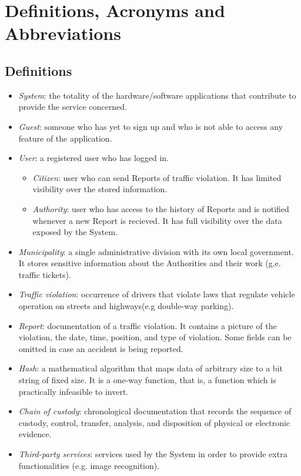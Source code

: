 \documentclass{report}
\begin{document}
\section{Definitions, Acronyms and Abbreviations}
\subsection{Definitions}
\begin{itemize}
	\item \textit{System}: the totality of the hardware/software applications that contribute to provide the service concerned.
    \item \textit{Guest}: someone who has yet to sign up and who is not able to access any feature of the application.
    \item \textit{User}: a registered user who has logged in.
	\begin{itemize}
		\item \textit{Citizen}: user who can send Reports of traffic violation. It has limited visibility over the stored information.
		\item \textit{Authority}: user who has access to the history of Reports and is notified whenever a new Report is recieved. It has full visibility over the data exposed by the System.
	\end{itemize} 
	\item \textit{Municipality}: a single administrative division with its own local government. It stores sensitive information about the Authorities and their work (g.e. traffic tickets).
    \item \textit{Traffic violation}: occurrence of drivers that violate laws that regulate vehicle operation on streets and highways(e.g double-way parking).
    \item \textit{Report}: documentation of a traffic violation. It contains a picture of the violation, the date, time, position, and type of violation. Some fields can be omitted in case an accident is being reported.
    \item \textit{Hash}: a mathematical algorithm that maps data of arbitrary size to a bit string of fixed size. It is a one-way function, that is, a function which is practically infeasible to invert.
    \item \textit{Chain of custody}: chronological documentation that records the sequence of custody, control, transfer, analysis, and disposition of physical or electronic evidence.
    \item \textit{Third-party services}: services used by the System in order to provide extra functionalities (e.g. image recognition).
\end{itemize}
\end{document}
